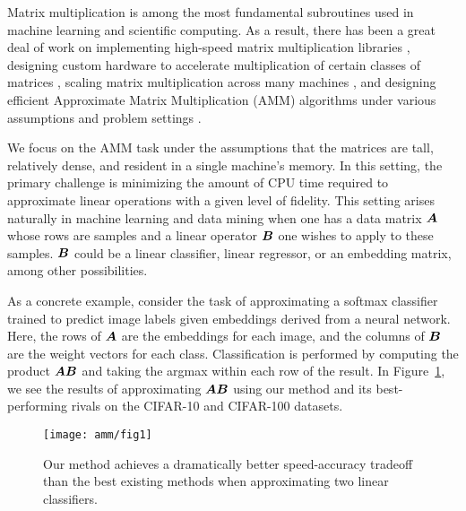 
Matrix multiplication is among the most fundamental subroutines used in machine learning and scientific computing. As a result, there has been a great deal of work on implementing high-speed matrix multiplication libraries \cite{pytorch,eigen,tensorflow}, designing custom hardware to accelerate multiplication of certain classes of matrices \cite{eie,eyeriss,scnn,tpu}, scaling matrix multiplication across many machines \cite{distributedCoded, shortDot, entangledPolynomial, matmulCommunicationBounds}, and designing efficient Approximate Matrix Multiplication (AMM) algorithms under various assumptions and problem settings \cite{drineas_fast_2006,manne_fast_2014,ye_frequent_2016,mroueh_co-occuring_2016,bolt}.

We focus on the AMM task under the assumptions that the matrices are tall, relatively dense, and resident in a single machine's memory. In this setting, the primary challenge is minimizing the amount of CPU time required to approximate linear operations with a given level of fidelity.
This setting arises naturally in machine learning and data mining when one has a data matrix $\bm{A}$ whose rows are samples and a linear operator $\bm{B}$ one wishes to apply to these samples. $\bm{B}$ could be a linear classifier, linear regressor, or an embedding matrix, among other possibilities.

As a concrete example, consider the task of approximating a softmax classifier trained to predict image labels given embeddings derived from a neural network. Here, the rows of $\bm{A}$ are the embeddings for each image, and the columns of $\bm{B}$ are the weight vectors for each class. Classification is performed by computing the product $\bm{A}\bm{B}$ and taking the argmax within each row of the result.
In Figure~\ref{fig:fig1}, we see the results of approximating $\bm{A}\bm{B}$ using our method and its best-performing rivals \cite{hashjl, sparsePCA} on the CIFAR-10 and CIFAR-100 datasets.
\vspace{1mm}
\begin{figure}[h]
\begin{center}
\texttt{[image: amm/fig1]}
\caption{Our method achieves a dramatically better speed-accuracy tradeoff than the best existing methods when approximating two linear classifiers.}
\label{fig:fig1}
\end{center}
\end{figure}
\vspace{-1mm}

